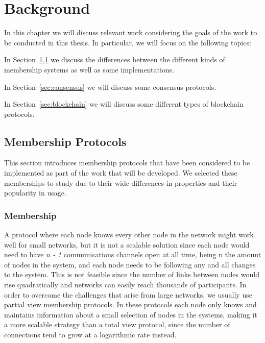 
%

\chapter{Background}\label{cha:Background}

In this chapter we will discuss relevant work considering the goals of the work
to be conducted in this thesis. In particular, we will focus on the following topics:

In Section~\ref{sec:membership_protocols} we discuss the differences between
the different kinds of membership systems as well as some implementations.

In Section~\ref{sec:consensus} we will discuss some consensus protocols.

In Section~\ref{sec:blockchain} we will discuss some different types of
blockchain protocols.

\section{Membership Protocols}\label{sec:membership_protocols}

This section introduces membership protocols that have been considered to
be implemented as part of the work that will be developed. We selected these
memberships to study due to their wide differences in properties and their
popularity in usage.

\subsection{Membership}\label{sub:membership}

A protocol where each node knows every other node in the network might work well
for small networks, but it is not a scalable solution since each node would need
to have \textit{n - 1} communications channels open at all time, being n the
amount of nodes in the system, and each node needs to be following any and all
changes to the system. This is not feasible since the number of links between
nodes would rise quadratically and networks can easily reach thousands of
participants. In order to overcome the challenges that arise from large networks,
we usually use partial view membership protocols. In these protocols each node only knows
and maintains information about a small selection of nodes in the systems,
making it a more scalable strategy than a total view protocol, since
the number of connections tend to grow at a logarithmic rate instead.

